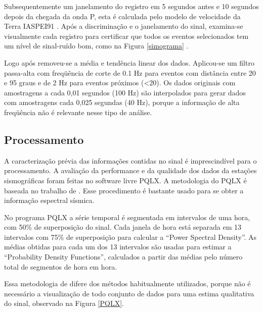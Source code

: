 Subsequentemente um janelamento do registro em 5 segundos antes e 10 segundos depois da chegada da onda P, esta é calculada pelo modelo de velocidade da Terra  IASPEI91 \citep{kennet_iaspei_1991}. Após a discriminação e o janelamento do sinal, examina-se visualmente cada registro para certificar que todos os eventos selecionados tem um nível de sinal-ruído bom, como na Figura \ref{simograma} . 

Logo após removeu-se a média e tendência linear dos dados. Aplicou-se um filtro passa-alta com freqüência de corte de 0.1 Hz para eventos com distância entre 20 e 95 graus e de 2 Hz para eventos próximos (<20). Os dados originais com amostragens a cada 0,01 segundos (100 Hz) são interpolados para gerar dados com amostragens cada 0,025 segundas (40 Hz), porque a informação de alta freqüência não é relevante nesse tipo de análise.

\subsection*{Processamento}

A caracterização prévia das informações contidas no sinal é imprescindível para o processamento. A avaliação da performance e da qualidade dos dados da estações sismográficas foram feitas no software livre PQLX.  A metodologia do PQLX é baseada no trabalho de \cite{McNamara_Buland_2004}. Esse procedimento é bastante usado para se obter a informação espectral sísmica.

No programa PQLX a série temporal é segmentada em intervalos de uma hora, com 50\% de superposição do sinal. Cada janela de hora está separada em 13 intervalos com 75\% de superposição para calcular a “Power Spectral Density”. As médias obtidas para cada um dos 13 intervalos são usadas para estimar a “Probability Density Functions”, calculados a partir das médias pelo número total de segmentos de hora em hora. 

Essa metodologia de \cite{McNamara_Buland_2004} difere dos métodos habitualmente utilizados, porque não é necessário a visualização de todo conjunto de dados para uma estima qualitativa do sinal, observado na Figura \ref{PQLX}.

